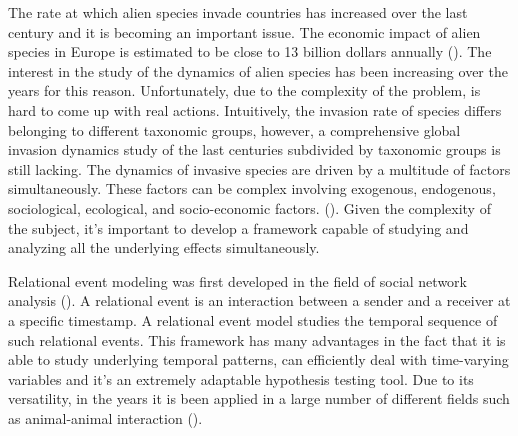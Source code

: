 \documentclass[mscthesis]{usiinfthesis}
\begin{document}
The rate at which alien species invade countries has increased over the last century and it is becoming an important issue. The economic impact of alien species in Europe is estimated to be close to 13 billion dollars annually (\cite{intro:rate}). The interest in the study of the dynamics of alien species has been increasing over the years for this reason. Unfortunately, due to the complexity of the problem, is hard to come up with real actions. Intuitively, the invasion rate of species differs belonging to different taxonomic groups, however, a comprehensive global invasion dynamics study of the last centuries subdivided by taxonomic groups is still lacking. The dynamics of invasive species are driven by a multitude of factors simultaneously. These factors can be complex involving exogenous, endogenous, sociological, ecological, and socio-economic factors. (\cite{intro:factors}). Given the complexity of the subject, it's important to develop a framework capable of studying and analyzing all the underlying effects simultaneously. 

Relational event modeling was first developed in the field of social network analysis (\cite{rem:butts}). A relational event is an interaction between a sender and a receiver at a specific timestamp. A relational event model studies the temporal sequence of such relational events. This framework has many advantages in the fact that it is able to study underlying temporal patterns, can efficiently deal with time-varying variables and it's an extremely adaptable hypothesis testing tool. Due to its versatility, in the years it is been applied in a large number of different fields such as animal-animal interaction (\citet{intro:cattle}).

%
\end{document}
